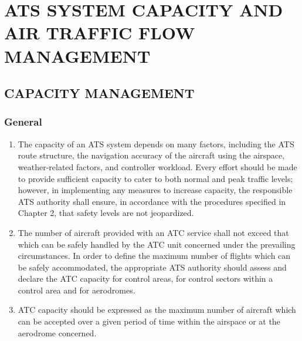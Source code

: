 
\chapterbegin

\section[ATS System Capacity and Air Traffic Flow Management]{ATS SYSTEM CAPACITY AND \\ AIR TRAFFIC FLOW MANAGEMENT}

\subsection[Capacity management]{CAPACITY MANAGEMENT}

\subsubsection{General}

\begin{enumerate}
    \item The capacity of an ATS system depends on many factors, including the ATS route structure, the navigation accuracy of the aircraft using the airspace, weather-related factors, and controller workload. Every effort should be made to provide sufficient capacity to cater to both normal and peak traffic levels; however, in implementing any measures to increase capacity, the responsible ATS authority shall ensure, in accordance with the procedures specified in Chapter 2, that safety levels are not jeopardized.
    \item The number of aircraft provided with an ATC service shall not exceed that which can be safely handled by the ATC unit concerned under the prevailing circumstances. In order to define the maximum number of flights which can be safely accommodated, the appropriate ATS authority should assess and declare the ATC capacity for control areas, for control sectors within a control area and for aerodromes.
    \item ATC capacity should be expressed as the maximum number of aircraft which can be accepted over a given period of time within the airspace or at the aerodrome concerned.
\end{enumerate}

